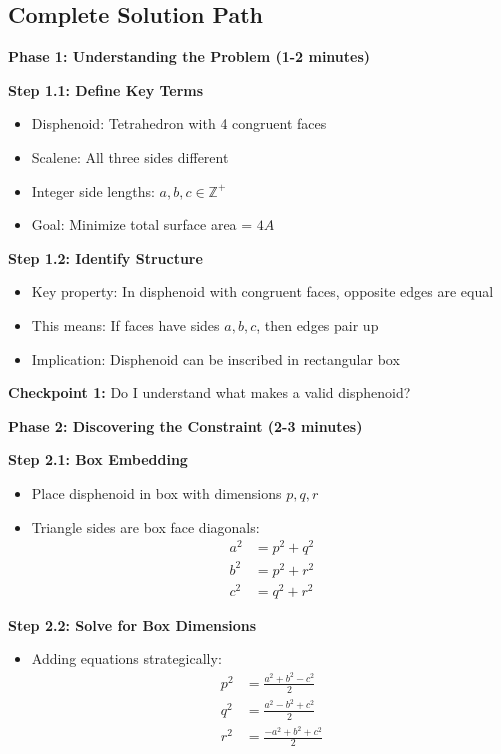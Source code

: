 \documentclass[12pt]{article}
\begin{document}
\begin{solutionbox}

\subsection*{Complete Solution Path}

\textbf{Phase 1: Understanding the Problem (1-2 minutes)}

\textbf{Step 1.1: Define Key Terms}
\begin{itemize}
    \item Disphenoid: Tetrahedron with 4 congruent faces
    \item Scalene: All three sides different
    \item Integer side lengths: $a, b, c \in \mathbb{Z}^+$
    \item Goal: Minimize total surface area = $4A$
\end{itemize}

\textbf{Step 1.2: Identify Structure}
\begin{itemize}
    \item Key property: In disphenoid with congruent faces, opposite edges are equal
    \item This means: If faces have sides $a, b, c$, then edges pair up
    \item Implication: Disphenoid can be inscribed in rectangular box
\end{itemize}

\textbf{Checkpoint 1:} Do I understand what makes a valid disphenoid?

\textbf{Phase 2: Discovering the Constraint (2-3 minutes)}

\textbf{Step 2.1: Box Embedding}
\begin{itemize}
    \item Place disphenoid in box with dimensions $p, q, r$
    \item Triangle sides are box face diagonals:
    \begin{align*}
    a^2 &= p^2 + q^2 \\
    b^2 &= p^2 + r^2 \\
    c^2 &= q^2 + r^2
    \end{align*}
\end{itemize}

\textbf{Step 2.2: Solve for Box Dimensions}
\begin{itemize}
    \item Adding equations strategically:
    \begin{align*}
    p^2 &= \frac{a^2 + b^2 - c^2}{2} \\
    q^2 &= \frac{a^2 - b^2 + c^2}{2} \\
    r^2 &= \frac{-a^2 + b^2 + c^2}{2}
    \end{align*}
\end{itemize}


\end{solutionbox}
\end{document}

